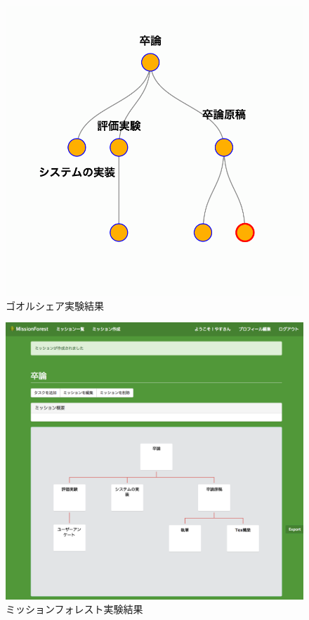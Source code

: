 \begin{figure}[t]
	\begin{center}
		\includegraphics[width=0.9\linewidth]{assets/img/experiment_goalshare.png}
		\caption{ゴオルシェア実験結果}
		\label{img:experiment_goalshare}
	\end{center}
\end{figure}

\begin{figure}[t]
	\begin{center}
		\includegraphics[width=0.9\linewidth]{assets/img/interface_capture_detail.png}
		\caption{ミッションフォレスト実験結果}
		\label{img:interface_capture_detail}
	\end{center}
\end{figure}

